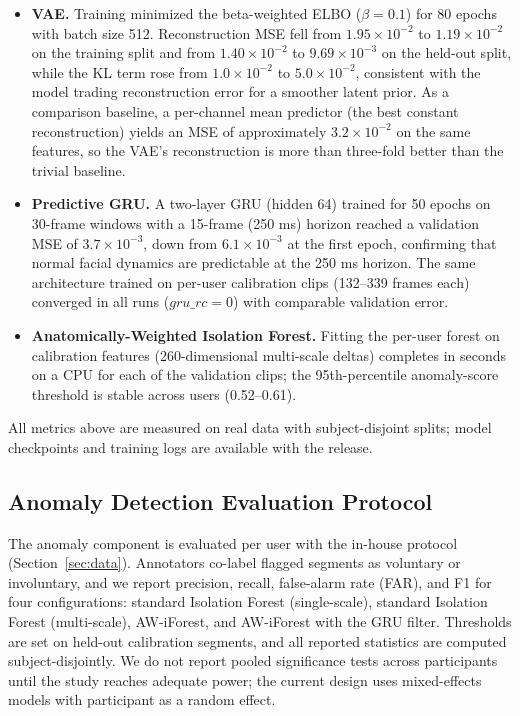 \documentclass[sigconf]{acmart}
\begin{document}
\begin{itemize}
    \item \textbf{VAE.} Training minimized the beta-weighted ELBO
          ($\beta = 0.1$) for 80 epochs with batch size 512. Reconstruction MSE
          fell from $1.95 \times 10^{-2}$ to $1.19 \times 10^{-2}$ on the
          training split and from $1.40 \times 10^{-2}$ to
          $9.69 \times 10^{-3}$ on the held-out split, while the KL term rose
          from $1.0 \times 10^{-2}$ to $5.0 \times 10^{-2}$, consistent with the
          model trading reconstruction error for a smoother latent prior. As a
          comparison baseline, a per-channel mean predictor (the best constant
          reconstruction) yields an MSE of approximately $3.2 \times 10^{-2}$ on
          the same features, so the VAE's reconstruction is more than
          three-fold better than the trivial baseline.
    \item \textbf{Predictive GRU.} A two-layer GRU (hidden 64) trained for 50
          epochs on 30-frame windows with a 15-frame (250 ms) horizon reached a
          validation MSE of $3.7 \times 10^{-3}$, down from $6.1 \times 10^{-3}$
          at the first epoch, confirming that normal facial dynamics are
          predictable at the 250 ms horizon. The same architecture trained on
          per-user calibration clips (132--339 frames each) converged in all
          runs ($gru\_rc = 0$) with comparable validation error.
    \item \textbf{Anatomically-Weighted Isolation Forest.} Fitting the
          per-user forest on calibration features (260-dimensional multi-scale
          deltas) completes in seconds on a CPU for each of the validation
          clips; the 95th-percentile anomaly-score threshold is stable across
          users (0.52--0.61).
\end{itemize}

All metrics above are measured on real data with subject-disjoint splits;
model checkpoints and training logs are available with the release.

\subsection{Anomaly Detection Evaluation Protocol}
The anomaly component is evaluated per user with the in-house protocol
(Section~\ref{sec:data}). Annotators co-label flagged segments as voluntary or
involuntary, and we report precision, recall, false-alarm rate (FAR), and F1
for four configurations: standard Isolation Forest (single-scale), standard
Isolation Forest (multi-scale), AW-iForest, and AW-iForest with the GRU filter.
Thresholds are set on held-out calibration segments, and all reported
statistics are computed subject-disjointly. We do not report pooled
significance tests across participants until the study reaches adequate power;
the current design uses mixed-effects models with participant as a random
effect.
\end{document}
